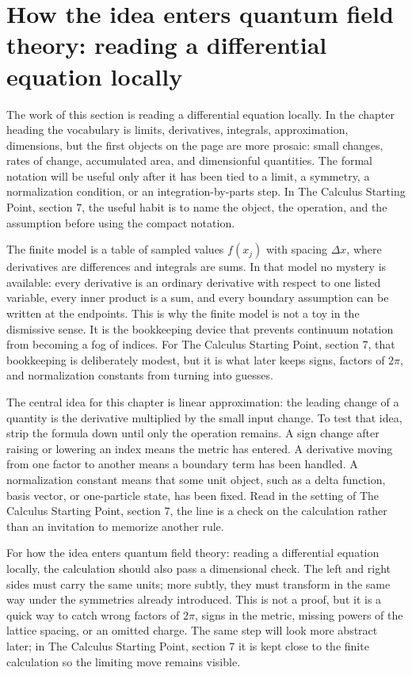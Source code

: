 \section{How the idea enters quantum field theory: reading a differential equation locally}

The work of this section is reading a differential equation locally.  In the chapter heading the vocabulary is limits, derivatives, integrals, approximation, dimensions, but the first objects on the page are more prosaic: small changes, rates of change, accumulated area, and dimensionful quantities.  The formal notation will be useful only after it has been tied to a limit, a symmetry, a normalization condition, or an integration-by-parts step.  In The Calculus Starting Point, section 7, the useful habit is to name the object, the operation, and the assumption before using the compact notation.

The finite model is a table of sampled values \(f(x_j)\) with spacing \(\Delta x\), where derivatives are differences and integrals are sums.  In that model no mystery is available: every derivative is an ordinary derivative with respect to one listed variable, every inner product is a sum, and every boundary assumption can be written at the endpoints.  This is why the finite model is not a toy in the dismissive sense.  It is the bookkeeping device that prevents continuum notation from becoming a fog of indices.  For The Calculus Starting Point, section 7, that bookkeeping is deliberately modest, but it is what later keeps signs, factors of \(2\pi\), and normalization constants from turning into guesses.

The central idea for this chapter is linear approximation: the leading change of a quantity is the derivative multiplied by the small input change.  To test that idea, strip the formula down until only the operation remains.  A sign change after raising or lowering an index means the metric has entered.  A derivative moving from one factor to another means a boundary term has been handled.  A normalization constant means that some unit object, such as a delta function, basis vector, or one-particle state, has been fixed.  Read in the setting of The Calculus Starting Point, section 7, the line is a check on the calculation rather than an invitation to memorize another rule.

For how the idea enters quantum field theory: reading a differential equation locally, the calculation should also pass a dimensional check.  The left and right sides must carry the same units; more subtly, they must transform in the same way under the symmetries already introduced.  This is not a proof, but it is a quick way to catch wrong factors of \(2\pi\), signs in the metric, missing powers of the lattice spacing, or an omitted charge.  The same step will look more abstract later; in The Calculus Starting Point, section 7 it is kept close to the finite calculation so the limiting move remains visible.

